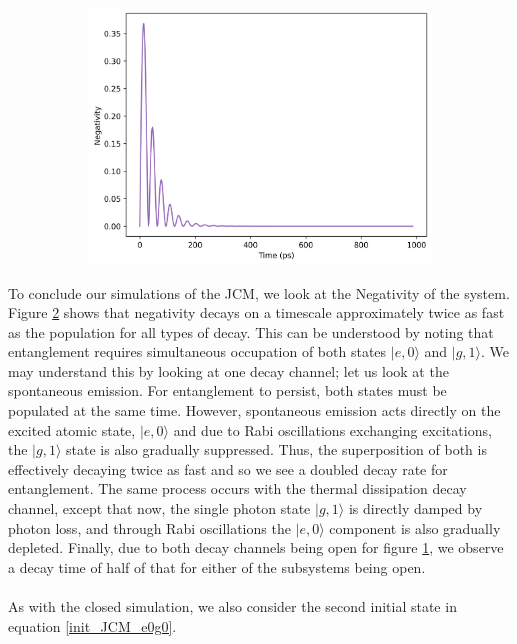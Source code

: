 \documentclass[11pt]{article}
\begin{document}
\begin{figure}[H]
    \vspace{0.5cm}
    
    \begin{subfigure}{0.45\textwidth}
        \centering
        \includegraphics[width=\linewidth]{Research Project/Code/results/JCM/OQS_Neg_Both.png}
        \caption{}
        \label{fig:JCM_OQS_Neg_Both}
    \end{subfigure}
    \hfill
    \caption{}
    \label{fig:JCM_OQS_Neg}
\end{figure}

To conclude our simulations of the JCM, we look at the Negativity of the system. Figure \ref{fig:JCM_OQS_Neg} shows that negativity decays on a timescale approximately twice as fast as the population for all types of decay. This can be understood by noting that entanglement requires simultaneous occupation of both states $|e,0\rangle$ and $|g,1\rangle$. We may understand this by looking at one decay channel; let us look at the spontaneous emission. For entanglement to persist, both states must be populated at the same time. However, spontaneous emission acts directly on the excited atomic state, $|e,0\rangle$  and due to Rabi oscillations exchanging excitations, the $|g,1\rangle$ state is also gradually suppressed. Thus, the superposition of both is effectively decaying twice as fast and so we see a doubled decay rate for entanglement. The same process occurs with the thermal dissipation decay channel, except that now, the single photon state $|g,1\rangle$ is directly damped by photon loss, and through Rabi oscillations the $|e,0\rangle$ component is also gradually depleted. Finally, due to both decay channels being open for figure \ref{fig:JCM_OQS_Neg_Both}, we observe a decay time of half of that for either of the subsystems being open. \\
\\
As with the closed simulation, we also consider the second initial state in equation \eqref{init_JCM_e0g0}.
\end{document}
